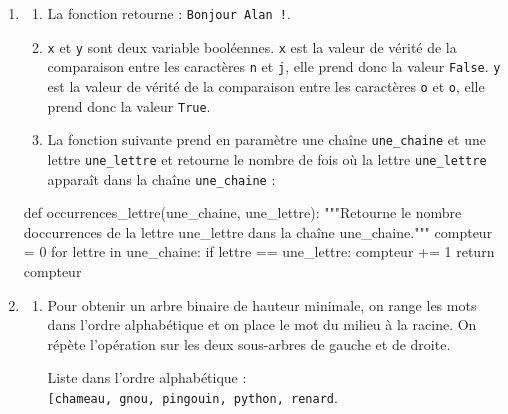 \documentclass[
  letterpaper,
  DIV=11,
  numbers=noendperiod]{scrartcl}
\newenvironment{Shaded}{\begin{snugshade}}{\end{snugshade}}
\newcommand{\CommentTok}[1]{\textcolor[rgb]{0.37,0.37,0.37}{#1}}
\newcommand{\ControlFlowTok}[1]{\textcolor[rgb]{0.00,0.23,0.31}{#1}}
\newcommand{\DecValTok}[1]{\textcolor[rgb]{0.68,0.00,0.00}{#1}}
\newcommand{\KeywordTok}[1]{\textcolor[rgb]{0.00,0.23,0.31}{#1}}
\newcommand{\NormalTok}[1]{\textcolor[rgb]{0.00,0.23,0.31}{#1}}
\newcommand{\OperatorTok}[1]{\textcolor[rgb]{0.37,0.37,0.37}{#1}}
\begin{document}
\begin{enumerate}
\def\labelenumi{\arabic{enumi}.}
\item
  \begin{enumerate}
  \def\labelenumii{\alph{enumii}.}
  \item
    La fonction retourne : \texttt{Bonjour\ Alan\ !}.
  \item
    \texttt{x} et \texttt{y} sont deux variable booléennes. \texttt{x}
    est la valeur de vérité de la comparaison entre les caractères
    \texttt{n} et \texttt{j}, elle prend donc la valeur \texttt{False}.
    \texttt{y} est la valeur de vérité de la comparaison entre les
    caractères \texttt{o} et \texttt{o}, elle prend donc la valeur
    \texttt{True}.
  \item
    La fonction suivante prend en paramètre une chaîne
    \texttt{une\_chaine} et une lettre \texttt{une\_lettre} et retourne
    le nombre de fois où la lettre \texttt{une\_lettre} apparaît dans la
    chaîne \texttt{une\_chaine} :
  \end{enumerate}

\begin{Shaded}
\begin{Highlighting}[]
\KeywordTok{def}\NormalTok{ occurrences\_lettre(une\_chaine, une\_lettre):}
    \CommentTok{"""Retourne le nombre d\textquotesingle{}occurrences de la lettre une\_lettre dans la chaîne une\_chaine."""}
\NormalTok{    compteur }\OperatorTok{=} \DecValTok{0}
    \ControlFlowTok{for}\NormalTok{ lettre }\KeywordTok{in}\NormalTok{ une\_chaine:}
        \ControlFlowTok{if}\NormalTok{ lettre }\OperatorTok{==}\NormalTok{ une\_lettre:}
\NormalTok{            compteur }\OperatorTok{+=} \DecValTok{1}
    \ControlFlowTok{return}\NormalTok{ compteur}
\end{Highlighting}
\end{Shaded}
\item
  \begin{enumerate}
  \def\labelenumii{\alph{enumii}.}
  \item
    Pour obtenir un arbre binaire de hauteur minimale, on range les mots
    dans l'ordre alphabétique et on place le mot du milieu à la racine.
    On répète l'opération sur les deux sous-arbres de gauche et de
    droite.

    Liste dans l'ordre alphabétique :
    \texttt{{[}\textquotesingle{}chameau\textquotesingle{},\ \textquotesingle{}gnou\textquotesingle{},\ \textquotesingle{}pingouin\textquotesingle{},\ \textquotesingle{}python\textquotesingle{},\ \textquotesingle{}renard\textquotesingle{}{]}}.


\end{enumerate}
\end{enumerate}
\end{document}
